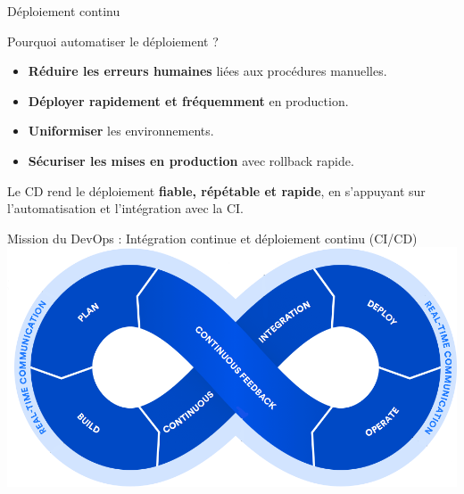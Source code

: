 \documentclass[aspectratio=169,10pt]{beamer}
\begin{document}

\begin{frame}{Déploiement continu}

  \begin{alertblock}{Pourquoi automatiser le déploiement ?}
    \begin{itemize}
      \item \textbf{Réduire les erreurs humaines} liées aux procédures manuelles.
      \item \textbf{Déployer rapidement et fréquemment} en production.
      \item \textbf{Uniformiser} les environnements.
      \item \textbf{Sécuriser les mises en production} avec rollback rapide.
    \end{itemize}
  \end{alertblock}

Le CD rend le déploiement \textbf{fiable, répétable et rapide}, 
en s’appuyant sur l’automatisation et l’intégration avec la CI.

\end{frame}


\begin{frame}{Mission du DevOps : Intégration continue et déploiement continu (CI/CD)}
\centering
\includegraphics[scale=0.38]{images/devops.png}

\end{frame}

\end{document}
